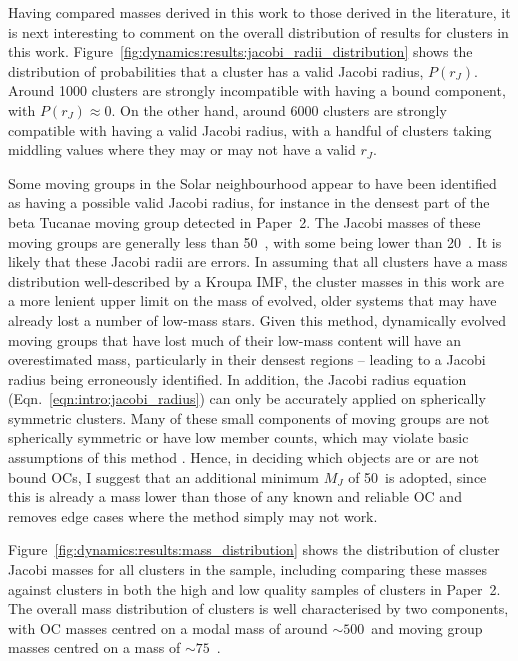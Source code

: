 Having compared masses derived in this work to those derived in the literature, it is next interesting to comment on the overall distribution of results for clusters in this work. Figure~\ref{fig:dynamics:results:jacobi_radii_distribution} shows the distribution of probabilities that a cluster has a valid Jacobi radius, $P(r_J)$. Around 1000 clusters are strongly incompatible with having a bound component, with $P(r_J)\approx0$. On the other hand, around 6000 clusters are strongly compatible with having a valid Jacobi radius, with a handful of clusters taking middling values where they may or may not have a valid $r_J$.

Some moving groups in the Solar neighbourhood appear to have been identified as having a possible valid Jacobi radius, for instance in the densest part of the beta Tucanae moving group detected in Paper~2. The Jacobi masses of these moving groups are generally less than 50~\MSun, with some being lower than 20~\MSun. It is likely that these Jacobi radii are errors. In assuming that all clusters have a mass distribution well-described by a Kroupa IMF, the cluster masses in this work are a more lenient upper limit on the mass of evolved, older systems that may have already lost a number of low-mass stars. Given this method, dynamically evolved moving groups that have lost much of their low-mass content will have an overestimated mass, particularly in their densest regions -- leading to a Jacobi radius being erroneously identified. In addition, the Jacobi radius equation (Eqn.~\ref{eqn:intro:jacobi_radius}) can only be accurately applied on spherically symmetric clusters. Many of these small components of moving groups are not spherically symmetric or have low member counts, which may violate basic assumptions of this method \citep{binney_galactic_1987}. Hence, in deciding which objects are or are not bound OCs, I suggest that an additional minimum $M_J$ of 50~\MSun is adopted, since this is already a mass lower than those of any known and reliable OC and removes edge cases where the method simply may not work.


Figure~\ref{fig:dynamics:results:mass_distribution} shows the distribution of cluster Jacobi masses for all clusters in the sample, including comparing these masses against clusters in both the high and low quality samples of clusters in Paper~2. The overall mass distribution of clusters is well characterised by two components, with OC masses centred on a modal mass of around $\sim500$~\MSun and moving group masses centred on a mass of  $\sim75$~\MSun. 

